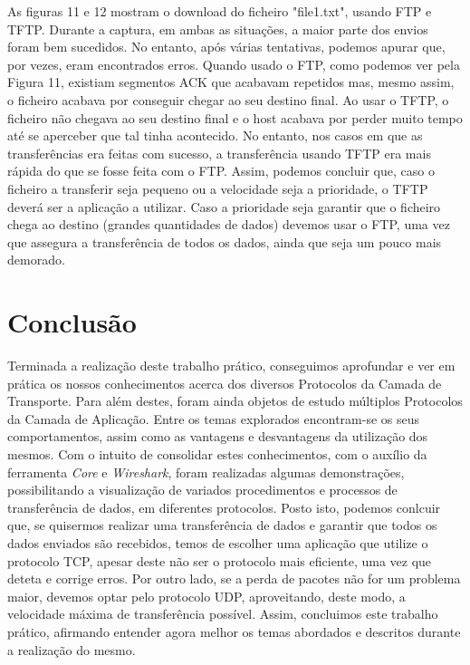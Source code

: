 \documentclass[11pt]{article}
\begin{document}
As figuras 11 e 12 mostram o download do ficheiro "file1.txt", usando FTP e TFTP. Durante a captura, em ambas as situações, a maior parte dos envios foram bem sucedidos. No entanto, após várias tentativas, podemos apurar que, por vezes, eram encontrados erros. 
Quando usado o FTP, como podemos ver pela Figura 11, existiam segmentos ACK que acabavam repetidos mas, mesmo assim, o ficheiro acabava por conseguir chegar ao seu destino final. Ao usar o TFTP, o ficheiro não chegava ao seu destino final e o host acabava por perder muito tempo até se aperceber que tal tinha acontecido.
No entanto, nos casos em que as transferências era feitas com sucesso, a transferência usando TFTP era mais rápida do que se fosse feita com o FTP. Assim, podemos concluir que, caso o ficheiro a transferir seja pequeno ou a velocidade seja a prioridade, o TFTP deverá ser a aplicação a utilizar. Caso a prioridade seja garantir que o ficheiro chega ao destino (grandes quantidades de dados) devemos usar o FTP, uma vez que assegura a transferência de todos os dados, ainda que seja um pouco mais demorado.


\clearpage
\section{Conclusão}

Terminada a realização deste trabalho prático, conseguimos aprofundar e ver em prática os nossos conhecimentos acerca dos diversos Protocolos da Camada de Transporte. Para além destes, foram ainda objetos de estudo múltiplos Protocolos da Camada de Aplicação. Entre os temas explorados encontram-se os seus comportamentos, assim como as vantagens e desvantagens da utilização dos mesmos.
Com o intuito de consolidar estes conhecimentos, com o auxílio da ferramenta \textit{Core} e \textit{Wireshark}, foram realizadas algumas demonstrações, possibilitando a visualização de variados procedimentos e processos de transferência de dados, em diferentes protocolos.
Posto isto, podemos conlcuir que, se quisermos realizar uma transferência de dados e garantir que todos os dados enviados são recebidos, temos de escolher uma aplicação que utilize o protocolo TCP, apesar deste não ser o protocolo mais eficiente, uma vez que deteta e corrige erros. Por outro lado, se a perda de pacotes não for um problema maior, devemos optar pelo protocolo UDP, aproveitando, deste modo, a velocidade máxima de transferência possível.
Assim, concluimos este trabalho prático, afirmando entender agora melhor os temas abordados e descritos durante a realização do mesmo.
\end{document}
